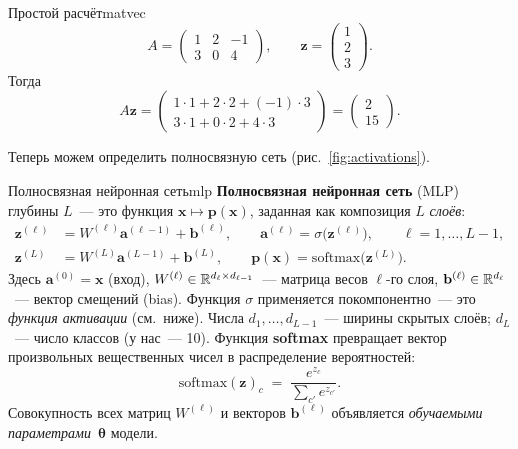 \begin{example}{Простой расчёт}{matvec}
\[
A=\begin{pmatrix}1 & 2 & -1\\ 3 & 0 & 4\end{pmatrix},\qquad
\mathbf z=\begin{pmatrix}1\\2\\3\end{pmatrix}.
\]
Тогда
\[
A\mathbf z=\begin{pmatrix}1\cdot 1+2\cdot 2+(-1)\cdot 3\\ 3\cdot 1+0\cdot 2+4\cdot 3\end{pmatrix}=
\begin{pmatrix}2\\15\end{pmatrix}.
\]
\end{example}

Теперь можем определить полносвязную сеть (рис.~\ref{fig:activations}).

\begin{definition}{Полносвязная нейронная сеть}{mlp}
\textbf{Полносвязная нейронная сеть} (MLP) глубины $L$~--- это функция
$\mathbf x\mapsto \mathbf p(\mathbf x)$, заданная как композиция
$L$ \emph{слоёв}:
\begin{align}
\mathbf z^{(\ell)} &= W^{(\ell)} \mathbf a^{(\ell-1)} + \mathbf b^{(\ell)},\qquad
\mathbf a^{(\ell)} = \sigma\bigl(\mathbf z^{(\ell)}\bigr),
\qquad \ell=1,\dots,L-1,
\label{eq:mlp-hidden}\\
\mathbf z^{(L)} &= W^{(L)} \mathbf a^{(L-1)} + \mathbf b^{(L)},\qquad
\mathbf p(\mathbf x) = \mathrm{softmax}\bigl(\mathbf z^{(L)}\bigr).
\label{eq:mlp-output}
\end{align}
Здесь $\mathbf a^{(0)}=\mathbf x$ (вход),
$W^{(\ell)}\in\mathbb{R}^{d_\ell\times d_{\ell-1}}$~--- матрица весов
$\ell$-го слоя, $\mathbf b^{(\ell)}\in\mathbb{R}^{d_\ell}$~--- вектор смещений
(bias). Функция $\sigma$ применяется покомпонентно~--- это
\emph{функция активации} (см.\ ниже). Числа $d_1,\dots,d_{L-1}$~---
ширины скрытых слоёв; $d_L$~--- число классов (у нас~--- 10). Функция
\textbf{softmax} превращает вектор произвольных вещественных чисел в
распределение вероятностей:
\begin{equation}\label{eq:softmax}
\mathrm{softmax}(\mathbf z)_c\;=\;\frac{e^{z_c}}{\sum_{c'} e^{z_{c'}}}.
\end{equation}
Совокупность всех матриц $W^{(\ell)}$ и векторов $\mathbf b^{(\ell)}$
объявляется \emph{обучаемыми параметрами}~$\boldsymbol\theta$ модели.
\end{definition}

